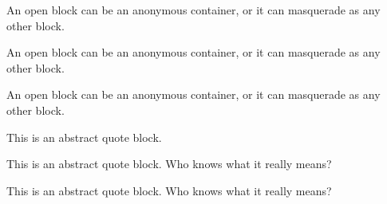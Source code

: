 An open block can be an anonymous container,
or it can masquerade as any other block.

An open block can be an anonymous container,
or it can masquerade as any other block.

An open block can be an anonymous container,
or it can masquerade as any other block.

This is an abstract quote block.

This is an abstract quote block.
Who knows what it really means?

This is an abstract quote block.
Who knows what it really means?
